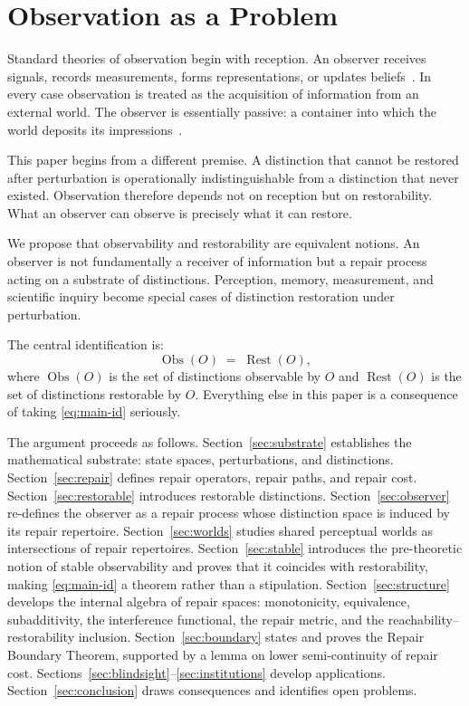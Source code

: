 \documentclass[12pt, oneside]{article}
\theoremstyle{plain}
\theoremstyle{definition}
\theoremstyle{remark}
\theoremstyle{definition}
\DeclareMathOperator{\Obs}{Obs}
\DeclareMathOperator{\Rest}{Rest}
\begin{document}
\section{Observation as a Problem}
\label{sec:intro}

Standard theories of observation begin with reception.
An observer receives signals, records measurements, forms
representations, or updates beliefs~\cite{Marr1982,Shannon1948}.
In every case observation is treated as the acquisition of information
from an external world.
The observer is essentially passive: a container into which the world
deposits its impressions~\cite{Gibson1979}.

This paper begins from a different premise.
A distinction that cannot be restored after perturbation is
operationally indistinguishable from a distinction that never existed.
Observation therefore depends not on reception but on restorability.
What an observer can observe is precisely what it can restore.

We propose that observability and restorability are equivalent notions.
An observer is not fundamentally a receiver of information but a
repair process acting on a substrate of distinctions.
Perception, memory, measurement, and scientific inquiry become special
cases of distinction restoration under perturbation.

The central identification is:
\begin{equation}
  \Obs(O) \;=\; \Rest(O),
  \label{eq:main-id}
\end{equation}
where $\Obs(O)$ is the set of distinctions observable by $O$ and
$\Rest(O)$ is the set of distinctions restorable by $O$.
Everything else in this paper is a consequence of taking
\eqref{eq:main-id} seriously.

The argument proceeds as follows.
Section~\ref{sec:substrate} establishes the mathematical substrate:
state spaces, perturbations, and distinctions.
Section~\ref{sec:repair} defines repair operators, repair paths, and
repair cost.
Section~\ref{sec:restorable} introduces restorable distinctions.
Section~\ref{sec:observer} re-defines the observer as a repair process
whose distinction space is induced by its repair repertoire.
Section~\ref{sec:worlds} studies shared perceptual worlds as
intersections of repair repertoires.
Section~\ref{sec:stable} introduces the pre-theoretic notion of
stable observability and proves that it coincides with restorability,
making \eqref{eq:main-id} a theorem rather than a stipulation.
Section~\ref{sec:structure} develops the internal algebra of repair
spaces: monotonicity, equivalence, subadditivity, the interference
functional, the repair metric, and the reachability--restorability
inclusion.
Section~\ref{sec:boundary} states and proves the Repair Boundary
Theorem, supported by a lemma on lower semi-continuity of repair cost.
Sections~\ref{sec:blindsight}--\ref{sec:institutions} develop
applications.
Section~\ref{sec:conclusion} draws consequences and identifies open
problems.
\end{document}

